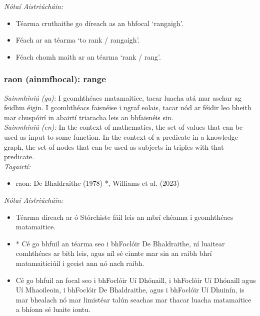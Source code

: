  \noindent \textit{Nótaí Aistriúcháin:}
\begin{itemize}
	\item Téarma cruthaithe go díreach as an bhfocal `rangaigh'.
	\item Féach ar an téarma `to rank / rangaigh'.
	\item Féach chomh maith ar an téarma `rank / rang'.
\end{itemize}


\subsubsection*{raon (ainmfhocal): range}
 \noindent \textit{Sainmhíniú (ga):} I gcomhthéacs matamaitice, tacar luacha atá mar aschur ag feidhm éigin. I gcomhthéacs faisnéise i ngraf eolais, tacar nód ar féidir leo bheith mar chuspóirí in abairtí triaracha leis an bhfaisnéis sin.
\\
 \noindent \textit{Sainmhíniú (en):} In the context of mathematics, the set of values that can be used as input to some function. In the context of a predicate in a knowledge graph, the set of nodes that can be used as subjects in triples with that predicate.
\\
 \noindent \textit{Tagairtí:}
\begin{itemize}
	\item raon: De Bhaldraithe (1978) \cite{de-bhaldraithe}*, Williams et al. (2023) \cite{storchiste}
\end{itemize}

 \noindent \textit{Nótaí Aistriúcháin:}
\begin{itemize}
	\item Téarma díreach ar ó Stórchiste fáil leis an mbrí chéanna i gcomhthéacs matamaitice.
	\item * Cé go bhfuil an téarma seo i bhFoclóir De Bhaldraithe, ní luaitear comhthéacs ar bith leis, agus níl sé cinnte mar sin an raibh bhrí matamaiticiúil i gceist ann nó nach raibh.
	\item Cé go bhfuil an focal seo i bhFoclóir Uí Dhónaill, i bhFoclóir Uí Dhónaill agus Uí Mhaoileoin, i bhFoclóir De Bhaldraithe, agus i bhFoclóir Uí Dhuinín, is mar bhealach nó mar limistéar talún seachas mar thacar luacha matamaitice a bhíonn sé luaite iontu.
\end{itemize}


